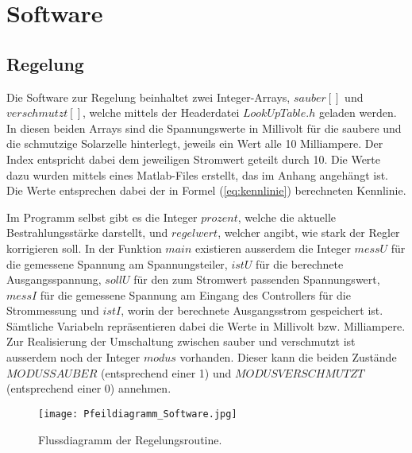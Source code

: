 \section{Software}

\subsection{Regelung}
Die Software zur Regelung beinhaltet zwei Integer-Arrays, $sauber[]$ und $verschmutzt[]$, welche mittels der Headerdatei $LookUpTable.h$ geladen werden. In diesen beiden Arrays sind die Spannungswerte in Millivolt für die saubere und die schmutzige Solarzelle hinterlegt, jeweils ein Wert alle 10 Milliampere. Der Index entspricht dabei dem jeweiligen Stromwert geteilt durch 10. \newline
Die Werte dazu wurden mittels eines Matlab-Files erstellt, das im Anhang angehängt ist. Die Werte entsprechen dabei der in Formel (\ref{eq:kennlinie}) berechneten Kennlinie.

Im Programm selbst gibt es die Integer $prozent$, welche die aktuelle Bestrahlungsstärke darstellt, und $regelwert$, welcher angibt, wie stark der Regler korrigieren soll. \newline
In der Funktion $main$ existieren ausserdem die Integer $messU$ für die gemessene Spannung am Spannungsteiler, $istU$ für die berechnete Ausgangsspannung, $sollU$ für den zum Stromwert passenden Spannungswert, $messI$ für die gemessene Spannung am Eingang des Controllers für die Strommessung und $istI$, worin der berechnete Ausgangsstrom gespeichert ist. Sämtliche Variabeln repräsentieren dabei die Werte in Millivolt bzw. Milliampere. \newline
Zur Realisierung der Umschaltung zwischen sauber und verschmutzt ist ausserdem noch der Integer $modus$ vorhanden. Dieser kann die beiden Zustände $MODUSSAUBER$ (entsprechend einer 1) und $MODUSVERSCHMUTZT$ (entsprechend einer 0) annehmen.

\begin{figure}[h]
	\centering
		\texttt{[image: Pfeildiagramm\_Software.jpg]}
	\caption{Flussdiagramm der Regelungsroutine.}
	\label{fig:Pfeildiagramm_Software}
\end{figure}

